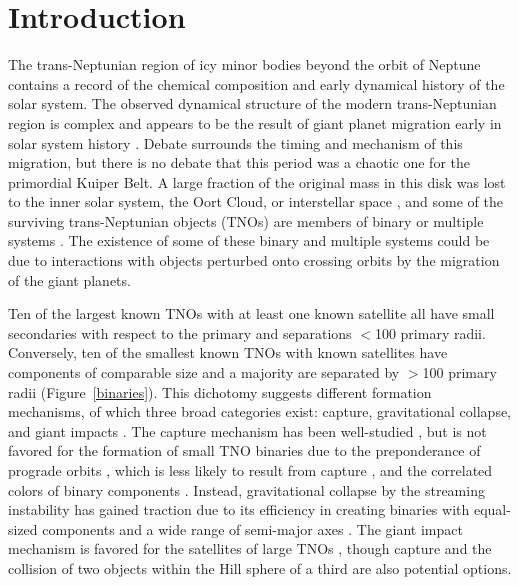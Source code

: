 \documentclass[onecolumn]{aastex631}
\begin{document}

\section{Introduction}
The trans-Neptunian region of icy minor bodies beyond the orbit of Neptune contains a record of the chemical composition and early dynamical history of the solar system. The observed dynamical structure of the modern trans-Neptunian region is complex \citep[e.g.,][]{Elliot2005, Gladman2008, Petit2011, Adams2014, Bannister2018,Bernardinelli2022} and appears to be the result of giant planet migration early in solar system history \citep[e.g.,][]{FI84,Gomes2005,HM2005,Morby2007,Walsh2011,Lawler2019}. Debate surrounds the timing and mechanism of this migration, but there is no debate that this period was a chaotic one for the primordial Kuiper Belt. A large fraction of the original mass in this disk was lost to the inner solar system, the Oort Cloud, or interstellar space \citep[e.g.,][]{Gomes2005,Dones2015,Malhotra2019}, and some of the surviving trans-Neptunian objects (TNOs) are members of binary or multiple systems \citep[e.g.,][]{Noll2020}. The existence of some of these binary and multiple systems could be due to interactions with objects perturbed onto crossing orbits by the migration of the giant planets.

Ten of the largest known TNOs with at least one known satellite all have small secondaries with respect to the primary and separations $<$100 primary radii. Conversely, ten of the smallest known TNOs with known satellites have components of comparable size and a majority are separated by $>$100 primary radii (Figure~\ref{binaries}). This dichotomy suggests different formation mechanisms, of which three broad categories exist: capture, gravitational collapse, and giant impacts \citep[e.g.,][]{Brunini2020}. The capture mechanism has been well-studied \citep[e.g.,][]{Goldreich2002,Weidenschilling2002, Funato2004,Astakhov2005,Lee2007,Schlichting2008,Kom11}, but is not favored for the formation of small TNO binaries due to the preponderance of prograde orbits \citep{Grundy2011,Grundy2019}, which is less likely to result from capture \citep{Schlichting2008}, and the correlated colors of binary components \citep{Benecchi2009}. Instead, gravitational collapse by the streaming instability has gained traction due to its efficiency in creating binaries with equal-sized components and a wide range of semi-major axes \citep{Youdin2005, Johansen2009, Nesvorny2010, Simon2017, Li2018}. The giant impact mechanism is favored for the satellites of large TNOs \citep[e.g.,][]{Canup2005, Canup2011,Br06}, though capture \citep{Goldreich2002} and the collision of two objects within the Hill sphere of a third \citep{Weidenschilling2002} are also potential options.
\end{document}
